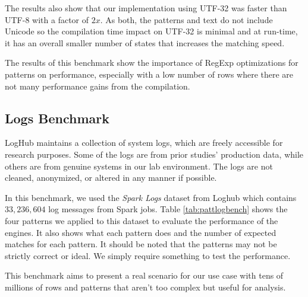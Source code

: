 The results also show that our implementation using UTF-32 was faster than UTF-8 with a factor of $2x$. As both, the patterns and text do not include Unicode so the compilation time impact on UTF-32 is minimal and at run-time, it has an overall smaller number of states that increases the matching speed.

The results of this benchmark show the importance of RegExp optimizations for patterns on performance, especially with a low number of rows where there are not many performance gains from the compilation.

\subsection{Logs Benchmark}

LogHub \cite{loghub} maintains a collection of system logs, which are freely accessible for research purposes. Some of the logs are from prior studies' production data, while others are from genuine systems in our lab environment. The logs are not cleaned, anonymized, or altered in any manner if possible.

In this benchmark, we used the \textit{Spark Logs} dataset from Loghub which contains $33,236,604$ log messages from Spark jobs. Table \ref{tab:pattlogbench} shows the four patterns we applied to this dataset to evaluate the performance of the engines. It also shows what each pattern does and the number of expected matches for each pattern. It should be noted that the patterns may not be strictly correct or ideal. We simply require something to test the performance.

This benchmark aims to present a real scenario for our use case with tens of millions of rows and patterns that aren't too complex but useful for analysis.

